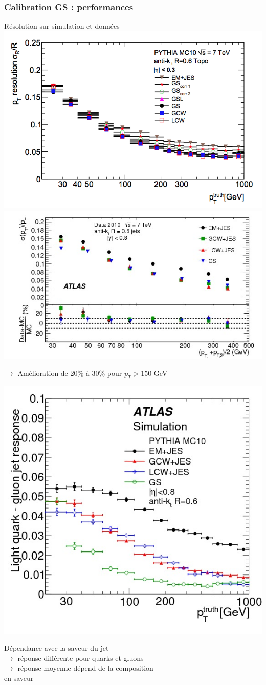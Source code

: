 \begin{frame}
\frametitle{Calibration GS : performances}
\vspace*{-0.8cm}
\begin{maliste}
\item R\'esolution sur simulation et donn\'ees
\hspace*{-1cm}
\includegraphics[width=.48\textwidth]{Figures/JES/GSCPerfResolOnMC.png}
\includegraphics[width=.54\textwidth]{Figures/JES/fig_13a.jpg}
\begin{center}
$\rightarrow$ Am\'elioration de 20\% \`a 30\% pour $p_T>150$ GeV 
\end{center}

\hspace*{7cm}
\includegraphics[width=.35\textwidth]{Figures/JES/fig_78a.jpg}
\vspace*{-3.5cm}
\item D\'ependance avec la saveur du jet\\
\vspace*{0.1cm}
$\rightarrow$ r\'eponse diff\'erente pour quarks et gluons\\
\vspace*{0.1cm}
$\rightarrow$ r\'eponse moyenne d\'epend de la composition\\
en saveur
\end{maliste}
\end{frame}

